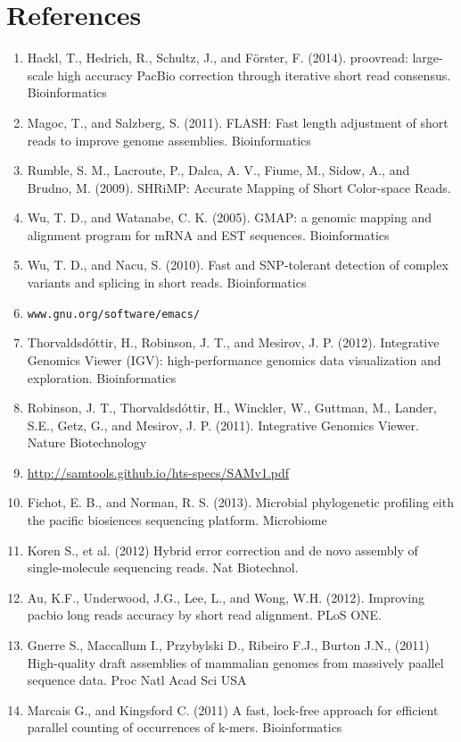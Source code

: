 \documentclass{scrartcl}
\begin{document}
\section{References}
\label{sec-10}
\begin{enumerate}
\item Hackl, T., Hedrich, R., Schultz, J., and Förster, F. (2014).
proovread: large-scale high accuracy PacBio correction through iterative short read consensus. Bioinformatics

\item Magoc, T., and Salzberg, S. (2011).
FLASH: Fast length adjustment of short reads to improve genome assemblies. Bioinformatics

\item Rumble, S. M., Lacroute, P., Dalca, A. V., Fiume, M., Sidow, A., and Brudno, M. (2009). 
SHRiMP: Accurate Mapping of Short Color-space Reads.

\item Wu, T. D., and Watanabe, C. K. (2005).
GMAP: a genomic mapping and alignment program for mRNA and EST sequences. Bioinformatics

\item Wu, T. D., and Nacu, S. (2010).
Fast and SNP-tolerant detection of complex variants and splicing in short reads. Bioinformatics

\item \texttt{www.gnu.org/software/emacs/}

\item Thorvaldsdóttir, H., Robinson, J. T., and Mesirov, J. P. (2012).
Integrative Genomics Viewer (IGV): high-performance genomics data visualization and exploration. Bioinformatics

\item Robinson, J. T., Thorvaldsdóttir, H., Winckler, W., Guttman, M., Lander, S.E., Getz, G., and Mesirov, J. P. (2011). 
Integrative Genomics Viewer. Nature Biotechnology

\item \url{http://samtools.github.io/hts-specs/SAMv1.pdf}

\item Fichot, E. B., and Norman, R. S. (2013).
Microbial phylogenetic profiling eith the pacific biosiences sequencing platform. Microbiome

\item Koren S., et al. (2012) 
Hybrid error correction and de novo assembly of single-molecule sequencing reads. Nat Biotechnol.

\item Au, K.F., Underwood, J.G., Lee, L., and Wong, W.H. (2012).
Improving pacbio long reads accuracy by short read alignment. PLoS ONE.

\item Gnerre S., Maccallum I., Przybylski D., Ribeiro F.J., Burton J.N., (2011)
High-quality draft assemblies of mammalian genomes from massively paallel sequence data. Proc Natl Acad Sci USA

\item Marcais G., and Kingsford C. (2011)
A fast, lock-free approach for efficient parallel counting of occurrences of k-mers. Bioinformatics
\end{enumerate}
\clearpage
\end{document}
